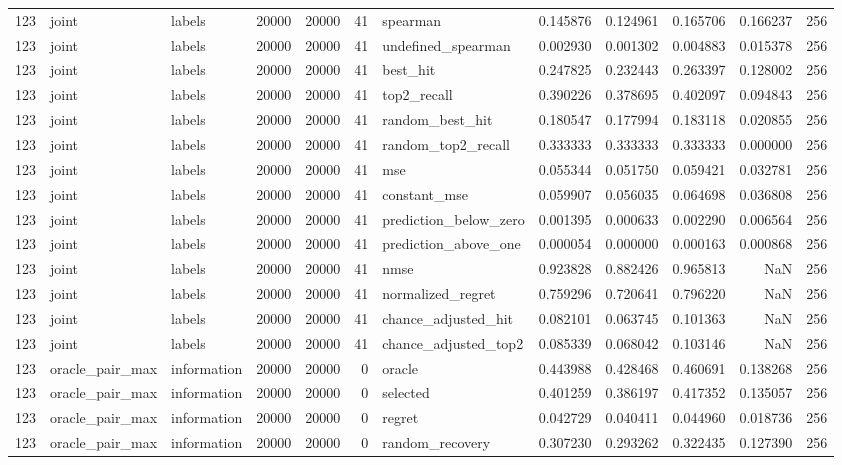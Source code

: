 \begin{tabular}{rllrrrlrrrrr}
123 & joint & labels & 20000 & 20000 & 41 & spearman & 0.145876 & 0.124961 & 0.165706 & 0.166237 & 256 \\
123 & joint & labels & 20000 & 20000 & 41 & undefined_spearman & 0.002930 & 0.001302 & 0.004883 & 0.015378 & 256 \\
123 & joint & labels & 20000 & 20000 & 41 & best_hit & 0.247825 & 0.232443 & 0.263397 & 0.128002 & 256 \\
123 & joint & labels & 20000 & 20000 & 41 & top2_recall & 0.390226 & 0.378695 & 0.402097 & 0.094843 & 256 \\
123 & joint & labels & 20000 & 20000 & 41 & random_best_hit & 0.180547 & 0.177994 & 0.183118 & 0.020855 & 256 \\
123 & joint & labels & 20000 & 20000 & 41 & random_top2_recall & 0.333333 & 0.333333 & 0.333333 & 0.000000 & 256 \\
123 & joint & labels & 20000 & 20000 & 41 & mse & 0.055344 & 0.051750 & 0.059421 & 0.032781 & 256 \\
123 & joint & labels & 20000 & 20000 & 41 & constant_mse & 0.059907 & 0.056035 & 0.064698 & 0.036808 & 256 \\
123 & joint & labels & 20000 & 20000 & 41 & prediction_below_zero & 0.001395 & 0.000633 & 0.002290 & 0.006564 & 256 \\
123 & joint & labels & 20000 & 20000 & 41 & prediction_above_one & 0.000054 & 0.000000 & 0.000163 & 0.000868 & 256 \\
123 & joint & labels & 20000 & 20000 & 41 & nmse & 0.923828 & 0.882426 & 0.965813 & NaN & 256 \\
123 & joint & labels & 20000 & 20000 & 41 & normalized_regret & 0.759296 & 0.720641 & 0.796220 & NaN & 256 \\
123 & joint & labels & 20000 & 20000 & 41 & chance_adjusted_hit & 0.082101 & 0.063745 & 0.101363 & NaN & 256 \\
123 & joint & labels & 20000 & 20000 & 41 & chance_adjusted_top2 & 0.085339 & 0.068042 & 0.103146 & NaN & 256 \\
123 & oracle_pair_max & information & 20000 & 20000 & 0 & oracle & 0.443988 & 0.428468 & 0.460691 & 0.138268 & 256 \\
123 & oracle_pair_max & information & 20000 & 20000 & 0 & selected & 0.401259 & 0.386197 & 0.417352 & 0.135057 & 256 \\
123 & oracle_pair_max & information & 20000 & 20000 & 0 & regret & 0.042729 & 0.040411 & 0.044960 & 0.018736 & 256 \\
123 & oracle_pair_max & information & 20000 & 20000 & 0 & random_recovery & 0.307230 & 0.293262 & 0.322435 & 0.127390 & 256 \\

\end{tabular}
